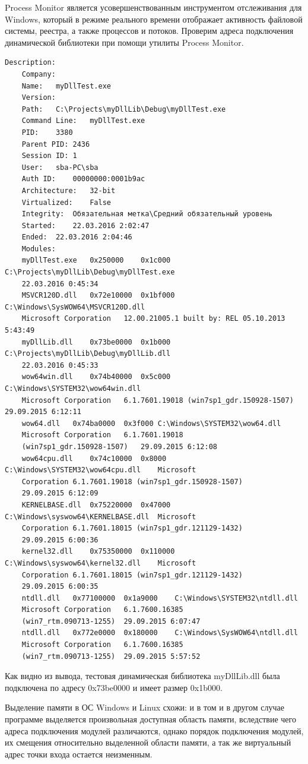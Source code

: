 Process Monitor является усовершенствованным инструментом отслеживания для Windows, который в режиме реального времени отображает активность файловой системы, реестра, а также процессов и потоков. Проверим адреса подключения динамической библиотеки при помощи утилиты Process Monitor.
\begin{Verbatim}[frame=single]
	Description:	
	Company:	
	Name:	myDllTest.exe
	Version:	
	Path:	C:\Projects\myDllLib\Debug\myDllTest.exe
	Command Line:	myDllTest.exe
	PID:	3380
	Parent PID:	2436
	Session ID:	1
	User:	sba-PC\sba
	Auth ID:	00000000:0001b9ac
	Architecture:	32-bit
	Virtualized:	False
	Integrity:	Обязательная метка\Средний обязательный уровень
	Started:	22.03.2016 2:02:47
	Ended:	22.03.2016 2:04:46
	Modules:
	myDllTest.exe	0x250000	0x1c000	C:\Projects\myDllLib\Debug\myDllTest.exe
	22.03.2016 0:45:34
	MSVCR120D.dll	0x72e10000	0x1bf000	C:\Windows\SysWOW64\MSVCR120D.dll
	Microsoft Corporation	12.00.21005.1 built by: REL	05.10.2013 5:43:49
	myDllLib.dll	0x73be0000	0x1b000	C:\Projects\myDllLib\Debug\myDllLib.dll
	22.03.2016 0:45:33
	wow64win.dll	0x74b40000	0x5c000	C:\Windows\SYSTEM32\wow64win.dll
	Microsoft Corporation	6.1.7601.19018 (win7sp1_gdr.150928-1507)	29.09.2015 6:12:11
	wow64.dll	0x74ba0000	0x3f000	C:\Windows\SYSTEM32\wow64.dll
	Microsoft Corporation	6.1.7601.19018
	(win7sp1_gdr.150928-1507)	29.09.2015 6:12:08
	wow64cpu.dll	0x74c10000	0x8000	C:\Windows\SYSTEM32\wow64cpu.dll	Microsoft
	Corporation	6.1.7601.19018 (win7sp1_gdr.150928-1507)
	29.09.2015 6:12:09
	KERNELBASE.dll	0x75220000	0x47000	C:\Windows\syswow64\KERNELBASE.dll	Microsoft
	Corporation	6.1.7601.18015 (win7sp1_gdr.121129-1432)
	29.09.2015 6:00:36
	kernel32.dll	0x75350000	0x110000	C:\Windows\syswow64\kernel32.dll	Microsoft
	Corporation	6.1.7601.18015 (win7sp1_gdr.121129-1432)
	29.09.2015 6:00:35
	ntdll.dll	0x77100000	0x1a9000	C:\Windows\SYSTEM32\ntdll.dll
	Microsoft Corporation	6.1.7600.16385
	(win7_rtm.090713-1255)	29.09.2015 6:07:47
	ntdll.dll	0x772e0000	0x180000	C:\Windows\SysWOW64\ntdll.dll
	Microsoft Corporation	6.1.7600.16385
	(win7_rtm.090713-1255)	29.09.2015 5:57:52
\end{Verbatim}
Как видно из вывода, тестовая динамическая библиотека myDllLib.dll была подключена по адресу 0x73be0000 и имеет размер 0x1b000.
			
Выделение памяти в ОС Windows и Linux схожи: и в том и в другом случае программе выделяется произвольная доступная область памяти, вследствие чего адреса подключения модулей различаются, однако порядок подключения модулей, их смещения относительно выделенной области памяти, а так же виртуальный адрес точки входа остается неизменным.
